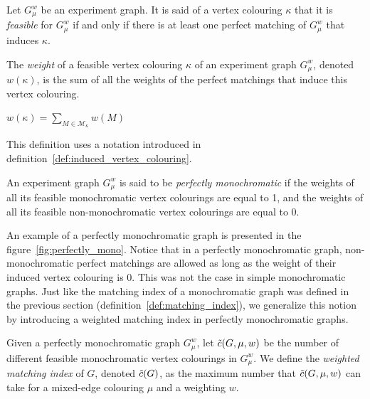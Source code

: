 \begin{definition}
    \label{def:feasible_vertex_colouring}
    Let $G_\mu^w$ be an experiment graph.
    It is said of a vertex colouring $\kappa$ that it is \textit{feasible} for $G_\mu^w$ if and only if there is at least one perfect matching of $G_\mu^w$ that induces $\kappa$.
\end{definition}

\begin{definition}
    \label{def:vertex_colouring_weight}
    The \textit{weight} of a feasible vertex colouring $\kappa$ of an experiment graph $G_\mu^w$, denoted $w(\kappa)$, is the sum of all the weights of the perfect matchings that induce this vertex colouring.
    
    \begin{center}
        $w(\kappa) = \sum\limits_{M \in \mathcal{M}_{\kappa}} w(M)$
    \end{center}

    This definition uses a notation introduced in definition~\ref{def:induced_vertex_colouring}.
\end{definition}

\begin{definition}
    \label{def:perfectly_monochromatic_graph}
    An experiment graph $G_\mu^w$ is said to be \textit{perfectly monochromatic} if the weights of all its feasible monochromatic vertex colourings are equal to 1, and the weights of all its feasible non-monochromatic vertex colourings are equal to 0.
\end{definition}

An example of a perfectly monochromatic graph is presented in the figure~\ref{fig:perfectly_mono}.
Notice that in a perfectly monochromatic graph, non-monochromatic perfect matchings are allowed as long as the weight of their induced vertex colouring is 0.
This was not the case in simple monochromatic graphs.
Just like the matching index of a monochromatic graph was defined in the previous section (definition~\ref{def:matching_index}), we generalize this notion by introducing a weighted matching index in perfectly monochromatic graphs.

\begin{definition}
    \label{def:weighted_matching_index}
    Given a perfectly monochromatic graph $G_\mu^w$, let $\Tilde{c}(G, \mu, w)$ be the number of different feasible monochromatic vertex colourings in $G_\mu^w$.
    We define the \textit{weighted matching index} of $G$, denoted $\Tilde{c}(G)$, as the maximum number that $\Tilde{c}(G, \mu, w)$ can take for a mixed-edge colouring $\mu$ and a weighting $w$.
\end{definition}

